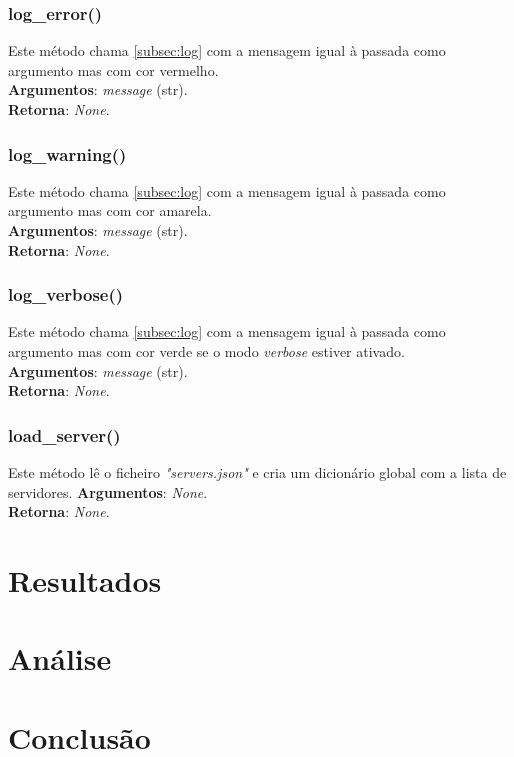 \documentclass{report}
\begin{document}
\subsection{log\_error()}
Este método chama \autoref{subsec:log} com a mensagem igual à passada como argumento mas com cor vermelho.\\ 
\textbf{Argumentos}:
\textit{message} (str).\\
\textbf{Retorna}: \textit{None}.

\subsection{log\_warning()}
Este método chama \autoref{subsec:log} com a mensagem igual à passada como argumento mas com cor amarela.\\ 
\textbf{Argumentos}:
\textit{message} (str).\\
\textbf{Retorna}: \textit{None}.

\subsection{log\_verbose()}
Este método chama \autoref{subsec:log} com a mensagem igual à passada como argumento mas com cor verde se o modo \textit{verbose} estiver ativado.\\ 
\textbf{Argumentos}:
\textit{message} (str).\\
\textbf{Retorna}: \textit{None}.

\subsection{load\_server()}
Este método lê o ficheiro \textit{"servers.json"} e cria um dicionário global com a lista de servidores.
\textbf{Argumentos}:
\textit{None}.\\
\textbf{Retorna}: \textit{None}.





\chapter{Resultados}
\label{chap:resultados}
\chapter{Análise}
\label{chap:analise}
\chapter{Conclusão}
\label{chap:conclusao}



\end{document}
